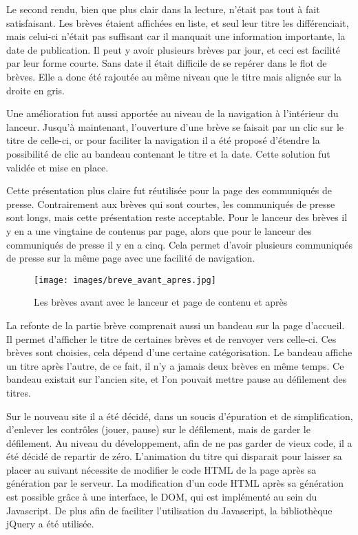 \documentclass[12pt,a4paper]{article}
\begin{document}
\medskip
Le second rendu, bien que plus clair dans la lecture, n'était pas tout à fait satisfaisant. Les brèves étaient affichées en liste, et seul leur titre les différenciait, mais celui-ci n'était pas suffisant car il manquait une information importante, la date de publication. Il peut y avoir plusieurs brèves par jour, et ceci est facilité par leur forme courte. Sans date il était difficile de se repérer dans le flot de brèves. Elle a donc été rajoutée au même niveau que le titre mais alignée sur la droite en gris.\par
Une amélioration fut aussi apportée au niveau de la navigation à l'intérieur du lanceur. Jusqu'à maintenant, l'ouverture d'une brève se faisait par un clic sur le titre de celle-ci, or pour faciliter la navigation il a été proposé d'étendre la possibilité de clic au bandeau contenant le titre et la date. Cette solution fut validée et mise en place.\par
\medskip
Cette présentation plus claire fut réutilisée pour la page des communiqués de presse. Contrairement aux brèves qui sont courtes, les communiqués de presse sont longs, mais cette présentation reste acceptable. Pour le lanceur des brèves il y en a une vingtaine de contenus par page, alors que pour le lanceur des communiqués de presse il y en a cinq. Cela permet d'avoir plusieurs communiqués de presse sur la même page avec une facilité de navigation.\par
\begin{figure}[h!]
\centering\texttt{[image: images/breve\_avant\_apres.jpg]} 
\caption{Les brèves avant avec le lanceur et page de contenu et après}
\end{figure}
\bigskip 
La refonte de la partie brève comprenait aussi un bandeau sur la page d'accueil. Il permet d'afficher le titre de certaines brèves et de renvoyer vers celle-ci. Ces brèves sont choisies, cela dépend d'une certaine catégorisation. Le bandeau affiche un titre après l'autre, de ce fait, il n'y a jamais deux brèves en même temps. Ce bandeau existait sur l'ancien site, et l'on pouvait mettre pause au défilement des titres.\par 
Sur le nouveau site il a été décidé, dans un soucis d'épuration et de simplification, d'enlever les contrôles (jouer, pause) sur le défilement, mais de garder le défilement. Au niveau du développement, afin de ne pas garder de vieux code, il a été décidé de repartir de zéro. L'animation du titre qui disparait pour laisser sa placer au suivant nécessite de modifier le code HTML de la page après sa génération par le serveur. La modification d'un code HTML après sa génération est possible grâce à une interface, le DOM, qui est implémenté au sein du Javascript. De plus afin de faciliter l'utilisation du Javascript, la bibliothèque jQuery a été utilisée.\par 
\end{document}

